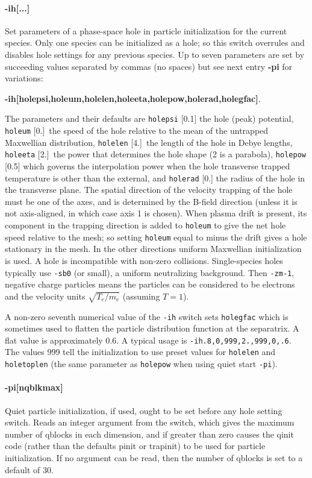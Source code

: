 \documentclass[12pt]{article}
\begin{document}
\paragraph{-ih[...]} Set parameters of a phase-space hole in particle
initialization for the current species. Only one species can be
initialized as a hole; so this switch overrules and disables hole
settings for any previous species. Up to seven parameters are set by
succeeding values separated by commas (no spaces) but see next entry
{\bf -pi} for variations:

\textbf{-ih[holepsi,holeum,holelen,holeeta,holepow,holerad,holegfac]}. 

\noindent The
parameters and their defaults are \verb!holepsi! [0.1] the hole (peak)
potential, \verb!holeum! [0.]\ the speed of the hole relative to the
mean of the untrapped Maxwellian distribution, \verb!holelen! [4.]\
the length of the hole in Debye lengths, \verb!holeeta! [2.]\ the
power that determines the hole shape (2 is a parabola), \verb!holepow!
[0.5] which governs the interpolation power when the hole transverse
trapped temperature is other than the external, and \verb!holerad!
[0.] the radius of the hole in the transverse plane.  The spatial
direction of the velocity trapping of the hole must be one of the
axes, and is determined by the B-field direction (unless it is not
axis-aligned, in which case axis 1 is chosen). When plasma drift is
present, its component in the trapping direction is added to
\verb!holeum! to give the net hole speed relative to the mesh; so
setting \verb!holeum! equal to minus the drift gives a hole stationary
in the mesh.  In the other directions uniform Maxwellian
initialization is used. A hole is incompatible with non-zero
collisions. Single-species holes typically use \verb!-sb0!  (or
small), a uniform neutralizing background. Then \verb!-zm-1!, negative
charge particles means the particles can be considered to be electrons
and the velocity units $\sqrt{T_e/m_e}$ (assuming $T=1$).

A non-zero seventh numerical value of the \verb!-ih! switch sets
\verb!holegfac! which is sometimes used to flatten the particle
distribution function at the separatrix. A flat value is approximately
0.6.  A typical usage is \verb!-ih.8,0,999,2.,999,0,.6!. The values
999 tell the initialization to use preset values for \verb!holelen!
and \verb!holetoplen! (the same parameter as \verb!holepow! when using
quiet start \verb!-pi!).


\paragraph{-pi[nqblkmax]} Quiet particle initialization, if used, ought to be
set before any hole setting switch. Reads an integer
argument from the switch, which gives the maximum number of qblocks in
each dimension, and if greater than zero causes the qinit code (rather
than the defaults pinit or trapinit) to be used for particle
initialization. If no argument can be read, then the number of qblocks
is set to a default of 30. 
\end{document}
